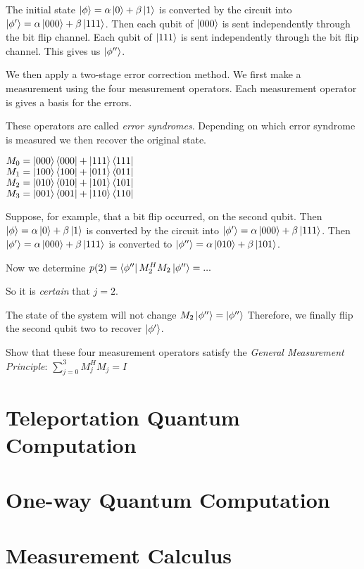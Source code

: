 The initial state $\left|\phi\right\rangle = \alpha \left|0\right\rangle + \beta \left|1\right\rangle$ is converted by
the circuit into $\left|\phi'\right\rangle = \alpha \left|000\right\rangle + \beta \left|111\right\rangle$.
Then each qubit of $\left|000\right\rangle$ is sent independently through the bit flip channel.
Each qubit of $\left|111\right\rangle$ is sent independently through the bit flip channel. 
This gives us $\left|\phi''\right\rangle$.

We then apply a two-stage error correction method. 
We first make a measurement using the four measurement
operators. Each measurement operator is gives a basis for the errors. 

These operators are called \textit{error syndromes}.
Depending on which error syndrome is measured we then recover the original
state.

$M_0 = \left|000\right\rangle\left\langle000\right| + \left|111\right\rangle\left\langle111\right|$ \\
$M_1 = \left|100\right\rangle\left\langle100\right| + \left|011\right\rangle\left\langle011\right|$ \\
$M_2 = \left|010\right\rangle\left\langle010\right| + \left|101\right\rangle\left\langle101\right|$ \\
$M_3 = \left|001\right\rangle\left\langle001\right| + \left|110\right\rangle\left\langle110\right|$ \\



\begin{example}
Suppose, for example, that a bit flip occurred, on the second qubit.
Then $\left|\phi\right\rangle = \alpha \left|0\right\rangle + \beta \left|1\right\rangle$ is converted by
the circuit into $\left|\phi'\right\rangle = \alpha \left|000\right\rangle + \beta \left|111\right\rangle$.
Then $\left|\phi'\right\rangle = \alpha \left|000\right\rangle + \beta \left|111\right\rangle$ is converted to 
$\left|\phi''\right\rangle = \alpha \left|010\right\rangle + \beta \left|101\right\rangle$. 

Now we determine $p(2) = \left\langle\phi''\right| M^{H}_{2} M_{2} \left|\phi''\right\rangle = ...$

\end{example}


So it is \textit{certain} that $j = 2$. 

The state of the system will not change $M_2 \left|\phi''\right\rangle = \left|\phi''\right\rangle$
Therefore, we finally flip the second qubit two to recover $\left|\phi'\right\rangle$.



\begin{example}
Show that these four measurement operators 
satisfy the \textit{General Measurement Principle}: $\sum^{3}_{j=0} M^{H}_{j} M_{j} = I$
\end{example}


\section{Teleportation Quantum Computation}


\section{One-way Quantum Computation}

\section{Measurement Calculus}